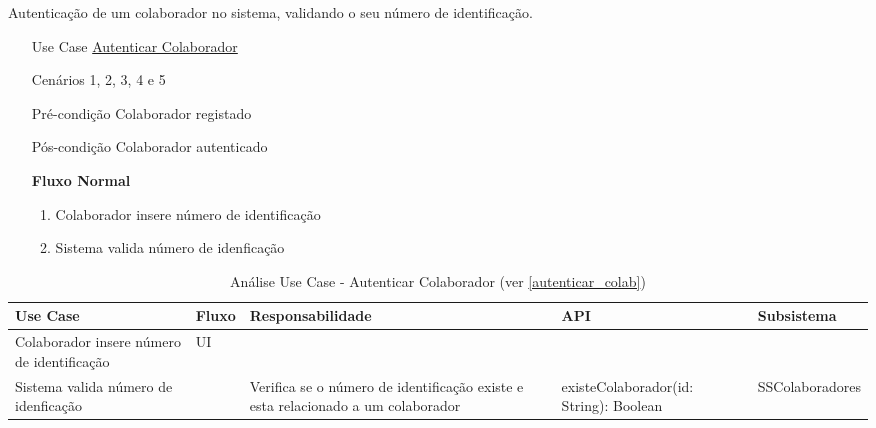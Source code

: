 \documentclass[../relatorio.tex]{subfiles}
\begin{document}
Autenticação de um colaborador no sistema, validando o seu número de identificação.
\begin{itemize}
    \item[Use Case] {\underline{Autenticar Colaborador}}
    \item[Cenários] {1, 2, 3, 4 e 5}
    \item[Pré-condição] {Colaborador registado}
    \item[Pós-condição] {Colaborador autenticado}
          \begin{flushleft}
              \textbf{Fluxo Normal}
          \end{flushleft}
          \begin{enumerate}
              \item Colaborador insere número de identificação
              \item Sistema valida número de idenficação
          \end{enumerate}
\end{itemize}
\begin{landscape}
    \begin{table}[!h]
        \centering
        \begin{tabular}{|p{5cm}|p{1cm}|p{4cm}|p{6cm}|p{3cm}|}
            \hline
            \rowcolor{gray!20!white}
            Use Case         & 
            Fluxo            & 
            Responsabilidade & 
            API              & 
            Subsistema
            \\
            \hline
            \rowcolor{yellow}
            Colaborador insere número de identificação
                             & UI
                             & 
                             & 
                             & 
            \\
            \hline
            Sistema valida número de idenficação
                             & 
                             & Verifica se o número de identificação existe e esta relacionado a um colaborador
                             & existeColaborador(id: String): Boolean
                             & SSColaboradores
            \\
            \hline
        \end{tabular}
        \caption{Análise Use Case - Autenticar Colaborador (ver \ref{autenticar_colab})}
    \end{table}
\end{landscape}
\end{document}
